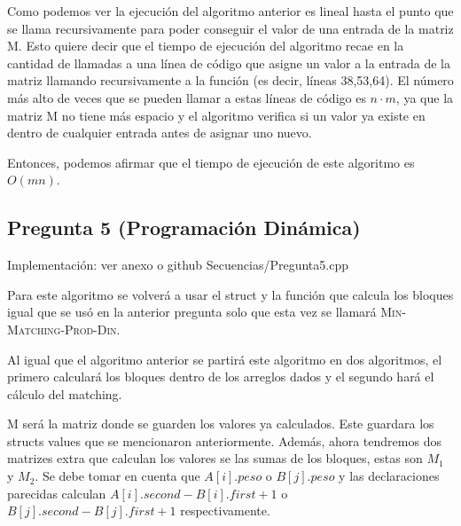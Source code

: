 \documentclass[12pt]{article}
\begin{document}
Como podemos ver la ejecución del algoritmo anterior es lineal hasta el punto que se llama recursivamente para poder conseguir el valor de una entrada de la matriz M. Esto quiere decir que el tiempo de ejecución del algoritmo recae en la cantidad de llamadas a una línea de código que asigne un valor a la entrada de la matriz llamando recursivamente a la función (es decir, líneas 38,53,64). El número más alto de veces que se pueden llamar a estas líneas de código es $n \cdot m$, ya que la matriz M no tiene más espacio y el algoritmo verifica si un valor ya existe en dentro de cualquier entrada antes de asignar uno nuevo.

Entonces, podemos afirmar que el tiempo de ejecución de este algoritmo es $O(mn)$.

\newpage
\subsection*{Pregunta 5 (Programación Dinámica)}

Implementación: ver anexo o github Secuencias/Pregunta5.cpp\vspace{5mm}

Para este algoritmo se volverá a usar el struct y la función que calcula los bloques igual que se usó en la anterior pregunta solo que esta vez se llamará \textsc{Min-Matching-Prod-Din}.

Al igual que el algoritmo anterior se partirá este algoritmo en dos algoritmos, el primero calculará los bloques dentro de los arreglos dados y el segundo hará el cálculo del matching.

M será la matriz donde se guarden los valores ya calculados. Este guardara los structs values que se mencionaron anteriormente. Además, ahora tendremos dos matrizes extra que calculan los valores se las sumas de los bloques, estas son $M_1$ y $M_2$.
Se debe tomar en cuenta que $A[i].peso$ o $B[j].peso$ y las declaraciones parecidas calculan $A[i].second-B[i].first+1$ o $B[j].second-B[j].first+1$ respectivamente.
\end{document}
